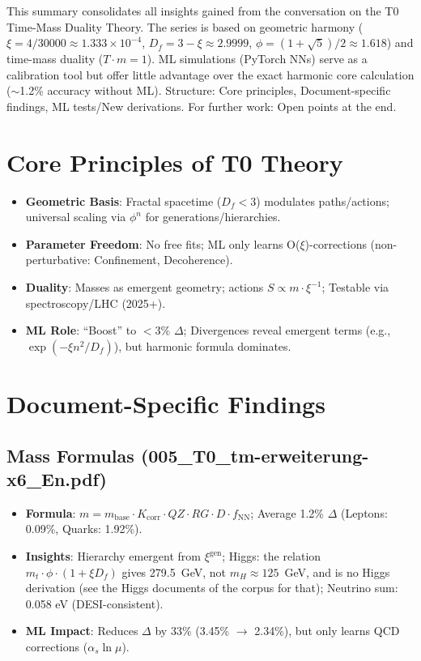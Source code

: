 This summary consolidates all insights gained from the conversation on the T0 Time-Mass Duality Theory. The series is based on geometric harmony ($\xi = 4/30000 \approx 1.333\times10^{-4}$, $D_f = 3 - \xi \approx 2.9999$, $\phi = (1+\sqrt{5})/2 \approx 1.618$) and time-mass duality ($T \cdot m = 1$). ML simulations (PyTorch NNs) serve as a calibration tool but offer little advantage over the exact harmonic core calculation ($\sim$1.2\% accuracy without ML). Structure: Core principles, Document-specific findings, ML tests/New derivations. For further work: Open points at the end.
	
	\section{Core Principles of T0 Theory}
	
	\begin{itemize}
		\item \textbf{Geometric Basis}: Fractal spacetime ($D_f < 3$) modulates paths/actions; universal scaling via $\phi^n$ for generations/hierarchies.
		\item \textbf{Parameter Freedom}: No free fits; ML only learns O($\xi$)-corrections (non-perturbative: Confinement, Decoherence).
		\item \textbf{Duality}: Masses as emergent geometry; actions $S \propto m \cdot \xi^{-1}$; Testable via spectroscopy/LHC (2025+).
		\item \textbf{ML Role}: ``Boost'' to $<$3\% $\Delta$; Divergences reveal emergent terms (e.g., $\exp(-\xi n^2 / D_f)$), but harmonic formula dominates.
	\end{itemize}
	
	\section{Document-Specific Findings}
	
	\subsection{Mass Formulas (005\_T0\_tm-erweiterung-x6\_En.pdf)}
	
	\begin{itemize}
		\item \textbf{Formula}: $m = m_\text{base} \cdot K_\text{corr} \cdot QZ \cdot RG \cdot D \cdot f_\text{NN}$; Average 1.2\% $\Delta$ (Leptons: 0.09\%, Quarks: 1.92\%).
		\item \textbf{Insights}: Hierarchy emergent from $\xi^\text{gen}$; Higgs: the relation $m_t \cdot \phi \cdot (1 + \xi D_f)$ gives 279.5~GeV, not $m_H \approx 125$~GeV, and is no Higgs derivation (see the Higgs documents of the corpus for that); Neutrino sum: 0.058 eV (DESI-consistent).
		\item \textbf{ML Impact}: Reduces $\Delta$ by 33\% (3.45\% $\to$ 2.34\%), but only learns QCD corrections ($\alpha_s \ln \mu$).
	\end{itemize}
	
